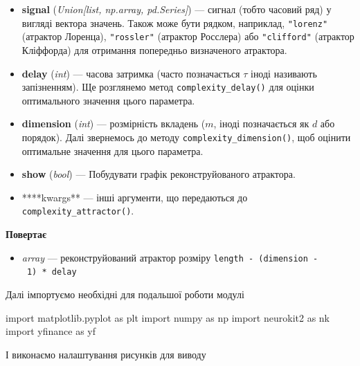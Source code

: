 \documentclass[
  letterpaper,
]{report}
\newenvironment{Shaded}{\begin{snugshade}}{\end{snugshade}}
\newcommand{\ImportTok}[1]{\textcolor[rgb]{0.00,0.46,0.62}{#1}}
\newcommand{\NormalTok}[1]{\textcolor[rgb]{0.00,0.23,0.31}{#1}}
\providecommand{\tightlist}{%
  \setlength{\itemsep}{0pt}\setlength{\parskip}{0pt}}\usepackage{longtable,booktabs,array}
\begin{document}
\begin{itemize}
\tightlist
\item
  \textbf{signal} (\emph{Union{[}list, np.array, pd.Series{]}}) ---
  сигнал (тобто часовий ряд) у вигляді вектора значень. Також може бути
  рядком, наприклад, \texttt{"lorenz"} (атрактор Лоренца),
  \texttt{"rossler"} (атрактор Росслера) або \texttt{"clifford"}
  (атрактор Кліффорда) для отримання попередньо визначеного атрактора.
\item
  \textbf{delay} (\emph{int}) --- часова затримка (часто позначається
  \(\tau\) іноді називають запізненням). Ще розглянемо метод
  \texttt{complexity\_delay()} для оцінки оптимального значення цього
  параметра.
\item
  \textbf{dimension} (\emph{int}) --- розмірність вкладень (\(m\), іноді
  позначається як \(d\) або порядок). Далі звернемось до методу
  \texttt{complexity\_dimension()}, щоб оцінити оптимальне значення для
  цього параметра.
\item
  \textbf{show} (\emph{bool}) --- Побудувати графік реконструйованого
  атрактора.
\item
  ****kwargs** --- інші аргументи, що передаються до
  \texttt{complexity\_attractor()}.
\end{itemize}

\textbf{Повертає}

\begin{itemize}
\tightlist
\item
  \emph{array} --- реконструйований атрактор розміру
  \texttt{length\ -\ (dimension\ -\ 1)\ *\ delay}
\end{itemize}

Далі імпортуємо необхідні для подальшої роботи модулі

\begin{Shaded}
\begin{Highlighting}[]
\ImportTok{import}\NormalTok{ matplotlib.pyplot }\ImportTok{as}\NormalTok{ plt }
\ImportTok{import}\NormalTok{ numpy }\ImportTok{as}\NormalTok{ np}
\ImportTok{import}\NormalTok{ neurokit2 }\ImportTok{as}\NormalTok{ nk}
\ImportTok{import}\NormalTok{ yfinance }\ImportTok{as}\NormalTok{ yf}
\end{Highlighting}
\end{Shaded}

І виконаємо налаштування рисунків для виводу
\end{document}
